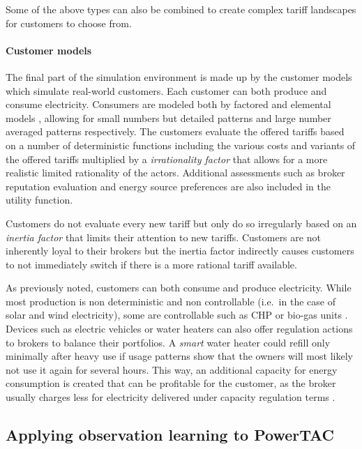 Some of the above types can also be combined to create complex tariff landscapes for customers to choose from.

\paragraph{Customer models}%

The final part of the simulation environment is made up by the customer models which simulate real-world customers.
Each customer can both produce and consume electricity. Consumers are modeled both by factored and elemental models
\citep[p.14]{ketter2018powertac}, allowing for small numbers but detailed patterns and large number averaged
patterns respectively. The customers evaluate the offered tariffs based on a number of deterministic functions
including the various costs and variants of the offered tariffs multiplied by a \emph{irrationality factor} that
allows for a more realistic limited rationality of the actors. Additional assessments such as broker reputation
evaluation and energy source preferences are also included in the utility function.

Customers do not evaluate every new tariff but only do so irregularly based on an \emph{inertia factor} that limits
their attention to new tariffs. Customers are not inherently loyal to their brokers but the inertia factor
indirectly causes customers to not immediately switch if there is a more rational tariff available.

As previously noted, customers can both consume and produce electricity. While most production is non deterministic
and non controllable (i.e.\ in the case of solar and wind electricity), some are controllable such as \ac{CHP} or
bio-gas units \citep[p.16]{ketter2018powertac}. Devices such as electric vehicles or water heaters can also offer
regulation actions to brokers to balance their portfolios. A \emph{smart} water heater could refill only minimally
after heavy use if usage patterns show that the owners will most likely not use it again for several hours. This
way, an additional capacity for energy consumption is created that can be profitable for the customer, as the broker
usually charges less for electricity delivered under capacity regulation terms \citep[p.14ff.]{ketter2018powertac}.

\subsection{Applying observation learning to PowerTAC}%
\label{sub:applying_observation_learning_to_powertac}

